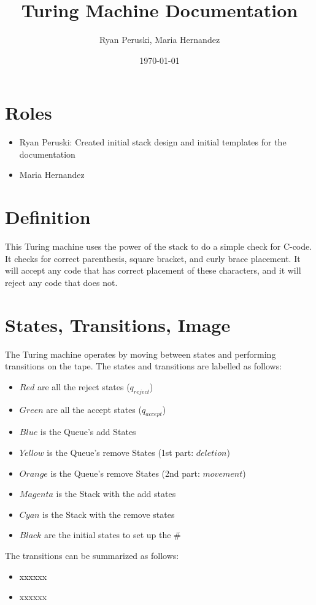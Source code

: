 \documentclass{article}
\title{Turing Machine Documentation}
\author{Ryan Peruski, Maria Hernandez}
\date{\today}
\begin{document}
\maketitle
\section{Roles}

\begin{itemize}
    \item Ryan Peruski: Created initial stack design and initial templates for the documentation
    \item Maria Hernandez
\end{itemize}
\section{Definition}
This Turing machine uses the power of the stack to do a simple check for C-code. It checks for correct parenthesis, square bracket, and curly brace
placement. It will accept any code that has correct placement of these characters, and it will reject any code that does not.

\section{States, Transitions, Image}
The Turing machine operates by moving between states and performing transitions on the tape. The states and transitions are labelled as follows:

\begin{itemize}
    \item $Red$ are all the reject states ($q_{reject}$)
    \item $Green$ are all the accept states ($q_{accept}$)
    \item $Blue$ is the Queue's add States
    \item $Yellow$ is the Queue's remove States (1st part: $deletion$)
    \item $Orange$ is the Queue's remove States  (2nd part: $movement$)
    \item $Magenta$ is the Stack with the add states
    \item $Cyan$ is the Stack with the remove states
    \item $Black$ are the initial states to set up the $\#$
\end{itemize}

The transitions can be summarized as follows:
\begin{itemize}
    \item xxxxxx
    \item xxxxxx
\end{itemize}
\end{document}
